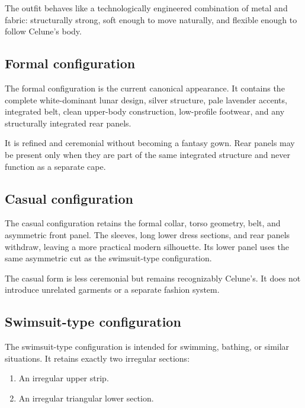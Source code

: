 \documentclass[10pt]{article}
\providecommand{\tightlist}{\setlength{\itemsep}{0pt}\setlength{\parskip}{0pt}}
\begin{document}
The outfit behaves like a technologically engineered combination of metal and fabric: structurally strong, soft enough to move naturally, and flexible enough to follow Celune's body.

\hypertarget{formal-configuration}{%
\subsection{Formal configuration}\label{formal-configuration}}

The formal configuration is the current canonical appearance. It contains the complete white-dominant lunar design, silver structure, pale lavender accents, integrated belt, clean upper-body construction, low-profile footwear, and any structurally integrated rear panels.

It is refined and ceremonial without becoming a fantasy gown. Rear panels may be present only when they are part of the same integrated structure and never function as a separate cape.

\hypertarget{casual-configuration}{%
\subsection{Casual configuration}\label{casual-configuration}}

The casual configuration retains the formal collar, torso geometry, belt, and asymmetric front panel. The sleeves, long lower dress sections, and rear panels withdraw, leaving a more practical modern silhouette. Its lower panel uses the same asymmetric cut as the swimsuit-type configuration.

The casual form is less ceremonial but remains recognizably Celune's. It does not introduce unrelated garments or a separate fashion system.

\hypertarget{swimsuit-type-configuration}{%
\subsection{Swimsuit-type configuration}\label{swimsuit-type-configuration}}

The swimsuit-type configuration is intended for swimming, bathing, or similar situations. It retains exactly two irregular sections:

\begin{enumerate}
\def\labelenumi{\arabic{enumi}.}
\tightlist
\item
  An irregular upper strip.
\item
  An irregular triangular lower section.
\end{enumerate}
\end{document}
